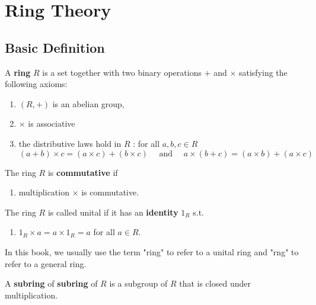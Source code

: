 \chapter{Ring Theory}

\section{Basic Definition} %
\begin{definition}
    A \textbf{ring} $R$ is a set together with two binary operations $+$ and $\times$ satisfying the following axioms:
    \begin{enumerate}[label=(\roman*)]
        \item
              $(R,+)$ is an abelian group,

        \item
              $\times $ is associative

        \item
              the distributive laws hold in $R$ : for all $a, b, c \in R$
              \begin{equation*}
                  (a+b) \times c=(a \times c)+(b \times c) \quad \text { and } \quad a \times(b+c)=(a \times b)+(a \times c)
              \end{equation*}
    \end{enumerate}
    The ring $R$ is \textbf{commutative} if
    \begin{enumerate}[resume,label=(\roman*)]
        \item
              multiplication $\times$ is commutative.
    \end{enumerate}
    The ring $R$ is called unital if it has an \textbf{identity} $1_R$  s.t.
    \begin{enumerate}[resume,label=(\roman*)]
        \item
              $1_R \times a=a \times 1_R=a$ for all $a \in R$.
    \end{enumerate}
    \begin{remark}
        In this book, we usually use the term "ring" to refer to a unital ring and "rng" to refer to a general ring.
    \end{remark}
\end{definition}

\begin{definition}
    A \textbf{subring} of \textbf{subring} of $R$ is a subgroup of $R$ that is closed under multiplication.
\end{definition}



